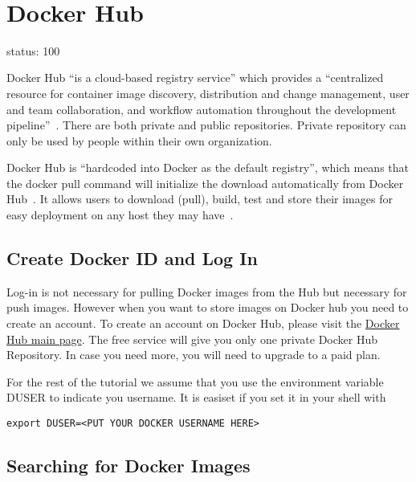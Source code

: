 \FILENAME\


\section{Docker Hub}

\label{s:dockerhub}

status: 100

Docker Hub ``is a cloud-based registry service'' which provides a 
``centralized resource for container image discovery, distribution and 
change management, user and team collaboration, and workflow automation 
throughout the development 
pipeline''~\cite{hid-sp18-405-tutorial-dockerhub-overview}. There are both 
private and public repositories. Private repository can only be used by people 
within their own organization.

Docker Hub is ``hardcoded into Docker as the default registry'', which means 
that the docker pull command will initialize the download automatically from 
Docker Hub~\cite{hid-sp18-405-tutorial-dockerhub-blog-use}. It allows users 
to download (pull), build, test and store their images for easy deployment on 
any host they may have~\cite{hid-sp18-405-tutorial-dockerhub-overview}.


\subsection{Create Docker ID and Log In }

Log-in is not necessary for pulling Docker images from the Hub but 
necessary for push images. However when you want to store images on 
Docker hub you need to create an account.  To create an account on Docker 
Hub, please visit the \href{https://hub.docker.com/}{Docker Hub main page}. 
The free service will give you only one private Docker Hub Repository. In case 
you need more, you will need to upgrade to a paid plan.

For the rest of the tutorial we assume that you use the environment
variable DUSER to indicate you username. It is easiset if you set it
in your shell with

\begin{lstlisting}
export DUSER=<PUT YOUR DOCKER USERNAME HERE> 
\end{lstlisting}

\subsection{Searching for Docker Images}

